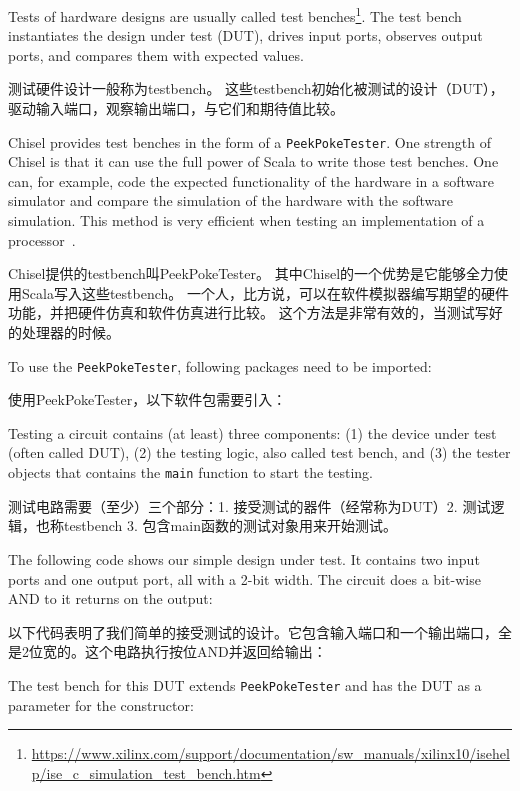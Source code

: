 \documentclass[%
    10pt,
    headinclude, footexclude,
    openright, %
    notitlepage,
    cleardoubleempty,
    headsepline,
    pointlessnumbers,
    bibtotoc, idxtotoc,
    ]{scrbook}
\newcommand{\code}[1]{{\small{\texttt{#1}}}}
\newcommand{\myref}[2]{\href{#1}{#2}}
\renewcommand{\myref}[2]{{#2}{\footnote{\url{#1}}}}
\begin{document}
Tests of hardware designs are usually called \myref{https://www.xilinx.com/support/documentation/sw_manuals/xilinx10/isehelp/ise_c_simulation_test_bench.htm}{test benches}.
The test bench instantiates the design under test (DUT), drives input ports, observes output ports,
and compares them with expected values.

测试硬件设计一般称为testbench。
这些testbench初始化被测试的设计（DUT），驱动输入端口，观察输出端口，与它们和期待值比较。

Chisel provides test benches in the form of a \code{PeekPokeTester}.
One strength of Chisel is that it can use the full power of Scala to write those
test benches. One can, for example, code the expected functionality of the hardware
in a software simulator and compare the simulation of the hardware with the
software simulation. This method is very efficient when testing an implementation
of a processor~\cite{lipsi:arcs2018}.

Chisel提供的testbench叫PeekPokeTester。
其中Chisel的一个优势是它能够全力使用Scala写入这些testbench。
一个人，比方说，可以在软件模拟器编写期望的硬件功能，并把硬件仿真和软件仿真进行比较。
这个方法是非常有效的，当测试写好的处理器的时候。

To use the \code{PeekPokeTester}, following packages need to be imported:

使用PeekPokeTester，以下软件包需要引入：


\noindent Testing a circuit contains (at least) three components: (1) the device under test (often
called DUT), (2) the testing logic, also called test bench, and (3) the tester objects
that contains the \code{main} function to start the testing.

测试电路需要（至少）三个部分：1. 接受测试的器件（经常称为DUT）2. 测试逻辑，也称testbench 3. 包含main函数的测试对象用来开始测试。

The following code shows our simple design under test. It contains two input
ports and one output port, all with a 2-bit width. The circuit does a bit-wise AND
to it returns on the output:

以下代码表明了我们简单的接受测试的设计。它包含输入端口和一个输出端口，全是2位宽的。这个电路执行按位AND并返回给输出：


\noindent The test bench for this DUT extends \code{PeekPokeTester} and has
the DUT as a parameter for the constructor:
\end{document}
